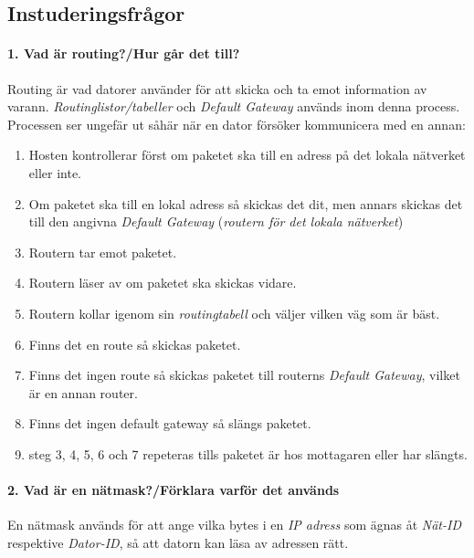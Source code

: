 \subsection{Instuderingsfrågor}

\paragraph{1. Vad är routing?/Hur går det till?}
Routing är vad datorer använder för att skicka och ta emot information av varann. \textit{Routinglistor/tabeller} och \textit{Default Gateway} används inom denna process. Processen ser ungefär ut såhär när en dator försöker kommunicera med en annan:
\begin{enumerate}
	\item Hosten kontrollerar först om paketet ska till en adress på det lokala nätverket eller inte.
	\item Om paketet ska till en lokal adress så skickas det dit, men annars skickas det till den angivna \textit{Default Gateway} (\textit{routern för det lokala nätverket})
	\item Routern tar emot paketet.
	\item Routern läser av om paketet ska skickas vidare.
	\item Routern kollar igenom sin \textit{routingtabell} och väljer vilken väg som är bäst.
	\item Finns det en route så skickas paketet.
	\item Finns det ingen route så skickas paketet till routerns \textit{Default Gateway}, vilket är en annan router.
	\item Finns det ingen default gateway så slängs paketet.
	\item steg 3, 4, 5, 6 och 7 repeteras tills paketet är hos mottagaren eller har slängts.
\end{enumerate}

\paragraph{2. Vad är en nätmask?/Förklara varför det används}
En nätmask används för att ange vilka bytes i en \textit{IP adress} som ägnas åt \textit{Nät-ID} respektive \textit{Dator-ID}, så att datorn kan läsa av adressen rätt.

